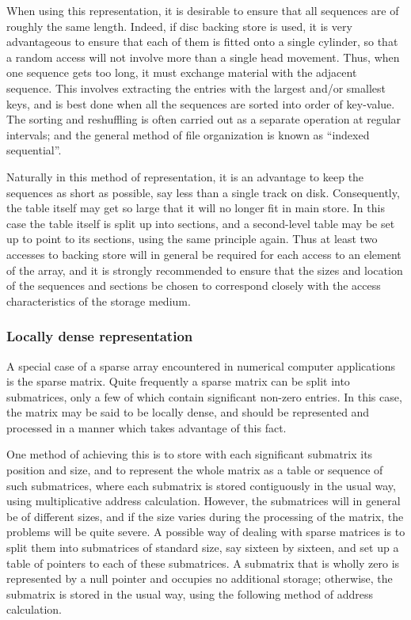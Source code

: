 \documentclass[twoside,11pt]{book}
\begin{document}
When using this representation, it is desirable to ensure that all sequences are of roughly the same length. Indeed, if disc backing store is used, it is very advantageous to ensure that each of them is fitted onto a single cylinder, so that a random access will not involve more than a single head movement. Thus, when one sequence gets too long, it must exchange material with the adjacent sequence. This involves extracting the entries with the largest and/or smallest keys, and is best done when all the sequences are sorted into order of key-value. The sorting and reshuffling is often carried out as a separate operation at regular intervals; and the general method of file organization is known as ``indexed sequential''.

Naturally in this method of representation, it is an advantage to keep the sequences as short as possible, say less than a single track on disk. Consequently, the table itself may get so large that it will no longer fit in main store. In this case the table itself is split up into sections, and a second-level table may be set up to point to its sections, using the same principle again. Thus at least two accesses to backing store will in general be required for each access to an element of the array, and it is strongly recommended to ensure that the sizes and location of the sequences and sections be chosen to correspond closely with the access characteristics of the storage medium.

\subsubsection{Locally dense representation}

A special case of a sparse array encountered in numerical computer applications is the sparse matrix. Quite frequently a sparse matrix can be split into submatrices, only a few of which contain significant non-zero entries. In this case, the matrix may be said to be locally dense, and should be represented and processed in a manner which takes advantage of this fact.

One method of achieving this is to store with each significant submatrix its position and size, and to represent the whole matrix as a table or sequence of such submatrices, where each submatrix is stored contiguously in the usual way, using multiplicative address calculation. However, the submatrices will in general be of different sizes, and if the size varies during the processing of the matrix, the problems will be quite severe. A possible way of dealing with sparse matrices is to split them into submatrices of standard size, say sixteen by sixteen, and set up a table of pointers to each of these submatrices. A submatrix that is wholly zero is represented by a null pointer and occupies no additional storage; otherwise, the submatrix is stored in the usual way, using the following method of address calculation.
\end{document}
